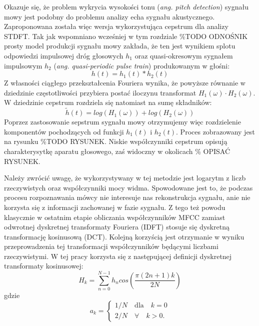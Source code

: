 Okazuje się, że problem wykrycia wysokości tonu (\textit{ang. pitch detection}) sygnału mowy jest podobny do problemu analizy echa sygnału akustycznego. Zaproponowana została więc wersja wykorzystująca cepstrum dla analizy STDFT\cite{noll}. Tak jak wspomniano wcześniej w tym rozdziale \%TODO ODNOŚNIK prosty model produkcji sygnału mowy zakłada, że ten jest wynikiem splotu odpowiedzi impulsowej dróg głosowych $h_1$ oraz quasi-okresowym sygnałem impulsowym $h_2$ (\textit{ang. quasi-periodic pulse train}) produkowanym w głośni:
\begin{equation}
    h(t) = h_1(t)*h_2(t)
\end{equation}
Z własności ciągłego przekształcenia Fouriera wynika, że powyższe równanie w dziedzinie częstotliwości przybiera postać iloczynu transformat $H_1(\omega) \cdot H_2(\omega)$. W dziedzinie cepstrum rozdziela się natomiast na sumę składników:
\begin{equation}
    \tilde{h}(t) = log(H_1(\omega)) + log(H_2(\omega))
\end{equation}
Poprzez zastosowanie sepstrum sygnału mowy otrzymujemy więc rozdzielenie komponentów pochodzących od funkcji $h_1(t)$ i $h_2(t)$. Proces zobrazowany jest na rysunku \%TODO RYSUNEK. Niskie współczynniki cepstrum opisują charakterysytkę aparatu głosowego, zaś widoczny w okolicach \% OPISAĆ RYSUNEK.

Należy zwrócić uwagę, że wykorzystywany w tej metodzie jest logarytm z liczb rzeczywistych oraz współczynniki mocy widma. Spowodowane jest to, że podczas procesu rozpoznawania mówcy nie interesuje nas rekonstrukcja sygnału, anie nie korzysta się z informacji zachowanej w fazie sygnału. Z tego też powodu klasycznie w ostatnim etapie obliczania współczynników MFCC zamiast odwrotnej dyskretnej transformaty Fouriera (IDFT) stosuje się dyskretną transformację kosinusową (DCT). Kolejną korzyścią jest otrzymanie w wyniku przeprowadzenia tej transformacji współczynników będącymi liczbami rzeczywistymi. W tej pracy korzysta się z następującej definicji dyskretnej transformaty kosinusowej:
\begin{equation}
    H_k = \sum_{n=0}^{N-1} h_ncos\left(\frac{\pi (2n+1)k}{2N}\right)
\end{equation}
gdzie
\begin{equation}
    a_k = 
    \begin{cases}
        1/N \quad \text{dla}\quad k=0 \\
        2/N \quad \forall \quad k>0.
    \end{cases}
\end{equation}

